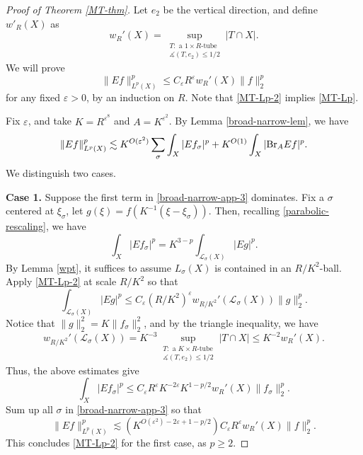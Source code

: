 \documentclass{amsart}
\numberwithin{equation}{section}
\newcommand{\e}{\varepsilon}
\newcommand{\si}{\sigma}
\newcommand{\cl}{\mathcal L}
\newcommand{\ang}{\measuredangle}
\newcommand{\BR}{{\rm{Br}}}
\begin{document}
\begin{proof}[Proof of Theorem \ref{MT-thm}]

Let $e_2$ be the vertical direction, and define $w'_R(X)$ as
\begin{equation}
\label{weight-1}
    w_R'(X)=\sup_{\substack{T:\text{ a $1\times R$-tube}\\ \ang(T, e_2)\leq 1/2}}|T\cap X|.
\end{equation}
We will prove
\begin{equation}
\label{MT-Lp-2}
    \|Ef\|_{L^p(X)}^p\leq C_\e R^\e w_R'(X)\|f\|_2^p
\end{equation}
for any fixed $\e>0$, by an induction on $R$.
Note that \eqref{MT-Lp-2} implies \eqref{MT-Lp}.

\smallskip

Fix $\e$, and take $K=R^{\e^8}$ and $A=K^{\e^2
}$.
By Lemma \ref{broad-narrow-lem}, we have
\begin{equation}
\label{broad-narrow-app-3}
    \|Ef\|_{L^p(X)}^p\lesssim K^{O(\e^2)}\sum_\si\int_X|Ef_\si|^p+K^{O(1)}\int_X|\BR_A Ef|^p.
\end{equation}
We distinguish two cases.

\smallskip

{\bf Case 1.} Suppose the first term in \eqref{broad-narrow-app-3} dominates.
Fix a $\si$ centered at $\xi_\si$, let $g(\xi)=f(K^{-1}(\xi-\xi_\si))$.
Then, recalling \eqref{parabolic-rescaling}, we have
\begin{equation}
    \int_X|Ef_\si|^p=K^{3-p}\int_{\cl_\si(X)}|Eg|^p.
\end{equation}
By Lemma \ref{wpt}, it suffices to assume $L_{\si}(X)$ is contained in an $R/K^2$-ball.
Apply \eqref{MT-Lp-2} at scale $R/K^2$ so that
\begin{equation}
    \int_{\cl_\si(X)}|Eg|^p\leq C_\e (R/K^2)^\e w_{R/K^2}'(\cl_\si(X))\|g\|_2^p.
\end{equation}
Notice that $\|g\|_2^2= K\|f_\si\|_2^2$, and by the triangle inequality, we have
\begin{equation}
    w_{R/K^2}'(\cl_\si(X))=K^{-3}\sup_{\substack{T:\text{ a $K\times R$-tube}\\ \ang(T, e_2)\leq 1/2}}|T\cap X|\leq K^{-2}w_R'(X).
\end{equation}
Thus, the above estimates give
\begin{equation}
    \int_X|Ef_\si|^p\leq C_\e R^\e K^{-2\e} K^{1-p/2}w_R'(X)\|f_\si\|_2^p.
\end{equation}
Sum up all $\si$ in \eqref{broad-narrow-app-3} so that 
\begin{equation}
    \|Ef\|_{L^p(X)}^p\lesssim (K^{O(\e^2)-2\e+1-p/2}) C_\e R^\e w_R'(X)\|f\|_2^p.
\end{equation}
This concludes \eqref{MT-Lp-2} for the first case, as $p\geq 2$.


\end{proof}
\end{document}
